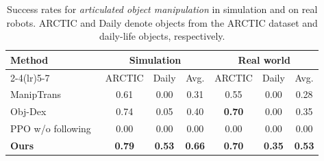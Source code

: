\documentclass[letterpaper]{article}
\begin{document}
\begin{table}[t]
\centering
\fontsize{9pt}{10.8pt}\selectfont
\renewcommand{\arraystretch}{1.15}
\setlength{\tabcolsep}{3pt}
\begin{tabular*}{\textwidth}{@{\extracolsep{\fill}}lcccccc@{}}
\toprule
Method & \multicolumn{3}{c}{Simulation} & \multicolumn{3}{c}{Real world} \\
\cmidrule(lr){2-4}\cmidrule(lr){5-7}
 & ARCTIC & Daily & Avg. & ARCTIC & Daily & Avg. \\
\midrule
ManipTrans~\cite{li2025maniptrans} & 0.61 & 0.00 & 0.31 & 0.55 & 0.00 & 0.28 \\
Obj-Dex~\cite{chen2024object} & 0.74 & 0.05 & 0.40 & \textbf{0.70} & 0.00 & 0.35 \\
PPO w/o following~\cite{schulman2017proximal} & 0.00 & 0.00 & 0.00 & 0.00 & 0.00 & 0.00 \\
\midrule
\textbf{Ours} & \textbf{0.79} & \textbf{0.53} & \textbf{0.66} & \textbf{0.70} & \textbf{0.35} & \textbf{0.53} \\
\bottomrule
\end{tabular*}
\caption{Success rates for \textit{articulated object manipulation} in simulation and on real robots. ARCTIC and Daily denote objects from the ARCTIC dataset and daily-life objects, respectively.}
\label{tab:hinge-sim}
\label{tab:hinge-real}
\end{table}
\end{document}
